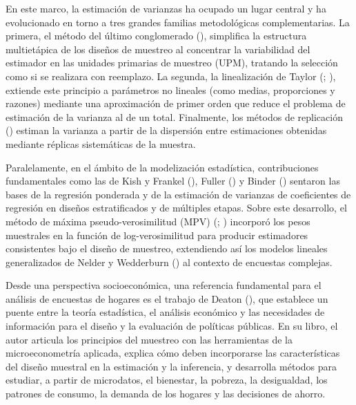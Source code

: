 \documentclass[
  spanish,
  11pt,
  letterpaper,
  oneside,
  open=any]{scrbook}
\begin{document}
En este marco, la estimación de varianzas ha ocupado un lugar central y
ha evolucionado en torno a tres grandes familias metodológicas
complementarias. La primera, el método del último conglomerado
(), simplifica la
estructura multietápica de los diseños de muestreo al concentrar la
variabilidad del estimador en las unidades primarias de muestreo (UPM),
tratando la selección como si se realizara con reemplazo. La segunda, la
linealización de Taylor (; ), extiende este
principio a parámetros no lineales (como medias, proporciones y razones)
mediante una aproximación de primer orden que reduce el problema de
estimación de la varianza al de un total. Finalmente, los métodos de
replicación () estiman la
varianza a partir de la dispersión entre estimaciones obtenidas mediante
réplicas sistemáticas de la muestra.

Paralelamente, en el ámbito de la modelización estadística,
contribuciones fundamentales como las de Kish y Frankel
(), Fuller
() y Binder
() sentaron las bases de la
regresión ponderada y de la estimación de varianzas de coeficientes de
regresión en diseños estratificados y de múltiples etapas. Sobre este
desarrollo, el método de máxima pseudo-verosimilitud (MPV)
(;
) incorporó los
pesos muestrales en la función de log-verosimilitud para producir
estimadores consistentes bajo el diseño de muestreo, extendiendo así los
modelos lineales generalizados de Nelder y Wedderburn
() al contexto de encuestas
complejas.

Desde una perspectiva socioeconómica, una referencia fundamental para el
análisis de encuestas de hogares es el trabajo de Deaton
(), que establece un puente entre la
teoría estadística, el análisis económico y las necesidades de
información para el diseño y la evaluación de políticas públicas. En su
libro, el autor articula los principios del muestreo con las
herramientas de la microeconometría aplicada, explica cómo deben
incorporarse las características del diseño muestral en la estimación y
la inferencia, y desarrolla métodos para estudiar, a partir de
microdatos, el bienestar, la pobreza, la desigualdad, los patrones de
consumo, la demanda de los hogares y las decisiones de ahorro.
\end{document}
